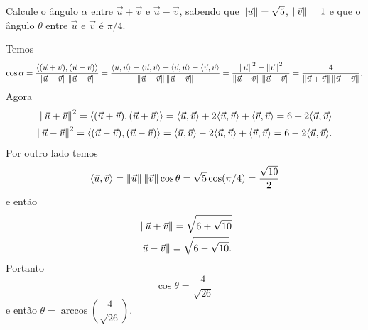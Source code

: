 \begin{exemplos}
    Calcule o ângulo $\alpha$ entre $\vec{u} + \vec{v}$ e $\vec{u} - \vec{v}$, sabendo que $\left\Vert{\vec{u}}\right\Vert = \sqrt{5}$, $\left\Vert{\vec{v}}\right\Vert = 1$ e que o ângulo $\theta$ entre $\vec{u}$ e $\vec{v}$ é $\pi/4$.
    \begin{solucao}
        Temos
        \begin{align*}
            \cos\alpha = \dfrac{\langle(\vec{u} + \vec{v}), (\vec{u} - \vec{v})\rangle}{\left\Vert{\vec{u} + \vec{v}}\right\Vert\left\Vert{\vec{u} - \vec{v}}\right\Vert} = \dfrac{\langle \vec{u}, \vec{u} \rangle - \langle \vec{u}, \vec{v} \rangle + \langle \vec{v}, \vec{u} \rangle - \langle \vec{v}, \vec{v} \rangle}{\left\Vert{\vec{u} + \vec{v}}\right\Vert\left\Vert{\vec{u} - \vec{v}}\right\Vert} = \dfrac{\left\Vert{\vec{u}}\right\Vert^2 - \left\Vert{\vec{v}}\right\Vert^2}{\left\Vert{\vec{u} - \vec{v}}\right\Vert\left\Vert{\vec{u} - \vec{v}}\right\Vert} = \dfrac{4}{\left\Vert{\vec{u} + \vec{v}}\right\Vert\left\Vert{\vec{u} - \vec{v}}\right\Vert}.
        \end{align*}
        Agora
        \begin{align*}
            \left\Vert{\vec{u} + \vec{v}}\right\Vert^2 = \langle(\vec{u} + \vec{v}), (\vec{u} + \vec{v})\rangle = \langle \vec{u}, \vec{v} \rangle + 2\langle \vec{u}, \vec{v} \rangle + \langle \vec{v}, \vec{v} \rangle = 6 + 2\langle \vec{u}, \vec{v} \rangle \\
            \left\Vert{\vec{u} - \vec{v}}\right\Vert^2 = \langle(\vec{u} - \vec{v}), (\vec{u} - \vec{v})\rangle = \langle \vec{u}, \vec{v} \rangle - 2\langle \vec{u}, \vec{v} \rangle + \langle \vec{v}, \vec{v} \rangle = 6 - 2\langle \vec{u}, \vec{v} \rangle.
        \end{align*}
        Por outro lado temos
        \begin{align*}
            \langle \vec{u}, \vec{v} \rangle = \left\Vert{\vec{u}}\right\Vert\left\Vert{\vec{v}}\right\Vert\cos\theta = \sqrt{5}\cos(\pi/4) = \dfrac{\sqrt{10}}{2}
        \end{align*}
        e então
        \begin{align*}
            \left\Vert{\vec{u} + \vec{v}}\right\Vert = \sqrt{6 + \sqrt{10}} \\
            \left\Vert{\vec{u} - \vec{v}}\right\Vert = \sqrt{6 - \sqrt{10}}.
        \end{align*}
        Portanto
        \[
            \cos\theta = \dfrac{4}{\sqrt{26}}
        \]
        e então $\theta = \arccos\left(\dfrac{4}{\sqrt{26}}\right)$.
    \end{solucao}
\end{exemplos}

